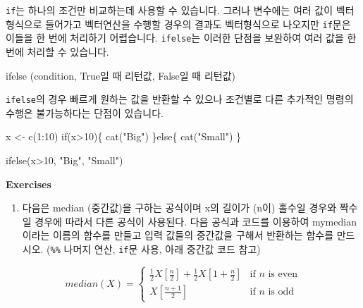 \documentclass[
  a4paper,
]{book}
\newenvironment{Shaded}{\begin{snugshade}}{\end{snugshade}}
\newcommand{\ControlFlowTok}[1]{\textcolor[rgb]{0.00,0.23,0.31}{#1}}
\newcommand{\DecValTok}[1]{\textcolor[rgb]{0.68,0.00,0.00}{#1}}
\newcommand{\FunctionTok}[1]{\textcolor[rgb]{0.28,0.35,0.67}{#1}}
\newcommand{\NormalTok}[1]{\textcolor[rgb]{0.00,0.23,0.31}{#1}}
\newcommand{\OtherTok}[1]{\textcolor[rgb]{0.00,0.23,0.31}{#1}}
\newcommand{\SpecialCharTok}[1]{\textcolor[rgb]{0.37,0.37,0.37}{#1}}
\newcommand{\StringTok}[1]{\textcolor[rgb]{0.13,0.47,0.30}{#1}}
\providecommand{\tightlist}{%
  \setlength{\itemsep}{0pt}\setlength{\parskip}{0pt}}\usepackage{longtable,booktabs,array}
\begin{document}
\texttt{if}는 하나의 조건만 비교하는데 사용할 수 있습니다. 그러나
변수에는 여러 값이 벡터형식으로 들어가고 벡터연산을 수행할 경우의 결과도
벡터형식으로 나오지만 \texttt{if}문은 이들을 한 번에 처리하기
어렵습니다. \texttt{ifelse}는 이러한 단점을 보완하여 여러 값을 한번에
처리할 수 있습니다.

\begin{Shaded}
\begin{Highlighting}[]
\FunctionTok{ifelse}\NormalTok{ (condition, True일 때 리턴값, False일 때 리턴값)}
\end{Highlighting}
\end{Shaded}

\texttt{ifelse}의 경우 빠르게 원하는 값을 반환할 수 있으나 조건별로 다른
추가적인 명령의 수행은 불가능하다는 단점이 있습니다.

\begin{Shaded}
\begin{Highlighting}[]
\NormalTok{x }\OtherTok{\textless{}{-}} \FunctionTok{c}\NormalTok{(}\DecValTok{1}\SpecialCharTok{:}\DecValTok{10}\NormalTok{)}
\ControlFlowTok{if}\NormalTok{(x}\SpecialCharTok{\textgreater{}}\DecValTok{10}\NormalTok{)\{}
  \FunctionTok{cat}\NormalTok{(}\StringTok{"Big"}\NormalTok{)}
\NormalTok{\}}\ControlFlowTok{else}\NormalTok{\{}
  \FunctionTok{cat}\NormalTok{(}\StringTok{"Small"}\NormalTok{)}
\NormalTok{\}}

\FunctionTok{ifelse}\NormalTok{(x}\SpecialCharTok{\textgreater{}}\DecValTok{10}\NormalTok{, }\StringTok{"Big"}\NormalTok{, }\StringTok{"Small"}\NormalTok{)}
\end{Highlighting}
\end{Shaded}

\textbf{Exercises}

\begin{enumerate}
\def\labelenumi{\arabic{enumi})}
\tightlist
\item
  다음은 median (중간값)을 구하는 공식이며 x의 길이가 (n이) 홀수일
  경우와 짝수일 경우에 따라서 다른 공식이 사용된다. 다음 공식과 코드를
  이용하여 mymedian 이라는 이름의 함수를 만들고 입력 값들의 중간값을
  구해서 반환하는 함수를 만드시오. (\texttt{\%\%} 나머지 연산,
  \texttt{if}문 사용, 아래 중간값 코드 참고)
\end{enumerate}

\[
median(X) =
\begin{cases}
\frac{1}{2} X[\frac{n}{2}] + \frac{1}{2} X[1+\frac{n}{2}] & \mbox{if } n \mbox{ is even} \\
X[\frac{n+1}{2}] & \mbox{if } n \mbox{ is odd}
\end{cases}
\]
\end{document}
